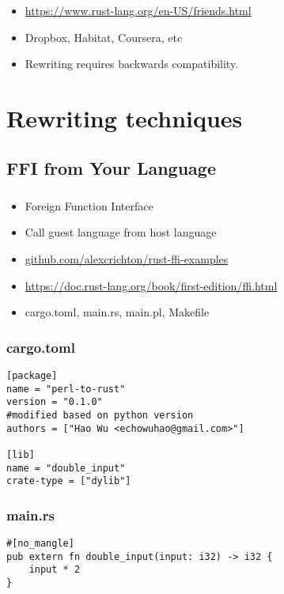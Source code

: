 \documentclass{beamer}
\begin{document}
\begin{frame}[fragile]
\frametitle{\insertsubsectionhead}
\begin{itemize}[<+(1)->]
\item \url{https://www.rust-lang.org/en-US/friends.html}
\item Dropbox, Habitat, Coursera, etc
\item Rewriting requires backwards compatibility.
\end{itemize}
\end{frame}


\section{Rewriting techniques}

\subsection{FFI from Your Language}

\begin{frame}[fragile]
\tableofcontents[currentsubsection]
\end{frame}


\begin{frame}[fragile]
\frametitle{\insertsubsectionhead}
\begin{itemize}[<+(1)->]
\item Foreign Function Interface
\item Call guest language from host language
\item \url{github.com/alexcrichton/rust-ffi-examples}
\item \url{https://doc.rust-lang.org/book/first-edition/ffi.html}
\item cargo.toml, main.rs, main.pl, Makefile
\end{itemize}
\end{frame}


\begin{frame}[fragile]
\frametitle{cargo.toml}
\begin{verbatim}
[package]
name = "perl-to-rust"
version = "0.1.0"
#modified based on python version
authors = ["Hao Wu <echowuhao@gmail.com>"]

[lib]
name = "double_input"
crate-type = ["dylib"]
\end{verbatim}
\end{frame}


\begin{frame}[fragile]
\frametitle{main.rs}
\begin{verbatim}
#[no_mangle]
pub extern fn double_input(input: i32) -> i32 {
    input * 2
}
\end{verbatim}
\end{frame}
\end{document}
